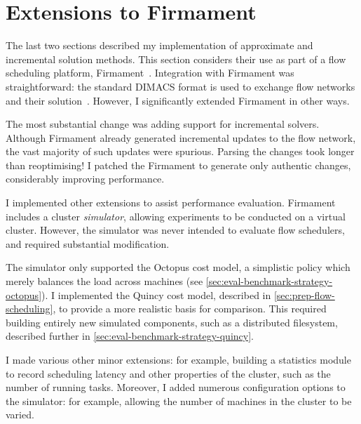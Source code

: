 \section{Extensions to Firmament} \label{sec:impl-firmament}



The last two sections described my implementation of approximate and incremental solution methods. This section considers their use as part of a flow scheduling platform, Firmament~\cite[ch.~5]{Schwarzkopf:2015}. Integration with Firmament was straightforward: the standard DIMACS format is used to exchange flow networks and their solution~\cite{DIMACSStandard}. However, I significantly extended Firmament in other ways.

The most substantial change was adding support for incremental solvers. Although Firmament already generated incremental updates to the flow network, the vast majority of such updates were spurious\footnotemark. Parsing the changes took longer than reoptimising! I patched the Firmament to generate only authentic changes, considerably improving performance.

I implemented other extensions to assist performance evaluation. Firmament includes a cluster \emph{simulator}, allowing experiments to be conducted on a virtual cluster. However, the simulator was never intended to evaluate flow schedulers, and required substantial modification.

The simulator only supported the Octopus cost model, a simplistic policy which merely balances the load across machines (see \cref{sec:eval-benchmark-strategy-octopus}). I implemented the Quincy cost model, described in \cref{sec:prep-flow-scheduling}, to provide a more realistic basis for comparison. This required building entirely new simulated components, such as a distributed filesystem, described further in \cref{sec:eval-benchmark-strategy-quincy}.

I made various other minor extensions: for example, building a statistics module to record scheduling latency and other properties of the cluster, such as the number of running tasks. Moreover, I added numerous configuration options to the simulator: for example, allowing the number of machines in the cluster to be varied.

